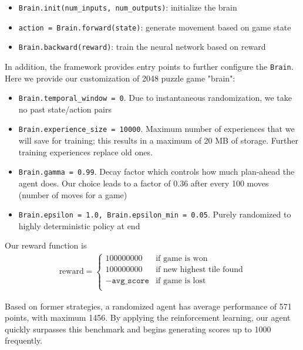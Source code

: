 \documentclass[9pt,twocolumn]{article}
\begin{document}
\begin{itemize}

\item \texttt{Brain.init(num\_inputs, num\_outputs)}: initialize the brain

\item \texttt{action = Brain.forward(state)}: generate movement based on game state

\item \texttt{Brain.backward(reward)}: train the neural network based on reward

\end{itemize}

In addition, the framework provides entry points to further configure the \texttt{Brain}. Here we provide our customization of 2048 puzzle game "brain":

\begin{itemize}

\item \texttt{Brain.temporal\_window = 0}. Due to instantaneous randomization, we take no past state/action pairs
\item \texttt{Brain.experience\_size = 10000}. Maximum number of experiences that we will save for training; this results in a maximum of 20 MB of storage. Further training experiences replace old ones.
\item \texttt{Brain.gamma = 0.99}. Decay factor which controls how much plan-ahead the agent does. Our choice leads to a factor of 0.36 after every 100 moves (number of moves for a game)
\item \texttt{Brain.epsilon = 1.0, Brain.epsilon\_min = 0.05}. Purely randomized to highly deterministic policy at end

\end{itemize}

Our reward function is \begin{align*}
\text{reward} =
\begin{cases}
100000000 & \text{if game is won} \\
100000000 & \text{if new highest tile found} \\
-\texttt{avg\_score} & \text{if game is lost} \\
\end{cases}
\end{align*}

Based on former strategies, a randomized agent has average performance of 571 points, with maximum 1456. By applying the reinforcement learning, our agent quickly surpasses this benchmark and begins generating scores up to 1000 frequently.
\end{document}
